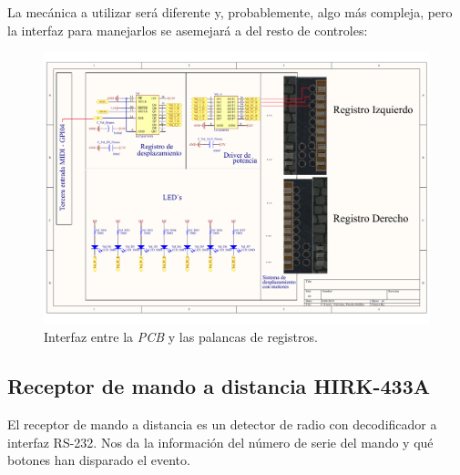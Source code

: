 La mecánica a utilizar será diferente y, probablemente, algo más compleja, pero la interfaz para manejarlos se asemejará a del resto de controles:

\smallskip

\begin{figure}[H]
	\noindent \begin{centering}
		\includegraphics[width=\linewidth*2/3]{capitulo3/pcb_registros}
		\par\end{centering}
	\smallskip
	\caption{\label{fig:pcb_registros} Interfaz entre la \textit{PCB} y las palancas de registros.}
\end{figure} 

\smallskip

\subsection{Receptor de mando a distancia HIRK-433A}

El receptor de mando a distancia es un detector de radio con decodificador a interfaz RS-232. Nos da la información del número de serie del mando y qué botones han disparado el evento. 

\smallskip

